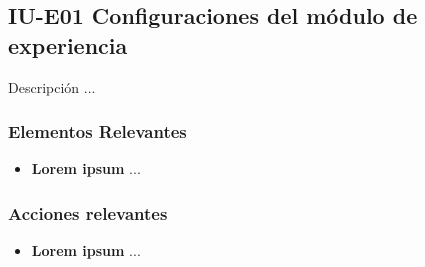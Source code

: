 
\subsection{IU-E01 Configuraciones del módulo de experiencia}

 Descripción ...


\subsubsection{Elementos Relevantes}

    \begin{itemize}
    \item {\bf Lorem ipsum}
        ...
    \end{itemize}

\subsubsection{Acciones relevantes}

    \begin{itemize}
    \item {\bf Lorem ipsum}
        ...
    \end{itemize}

\clearpage
